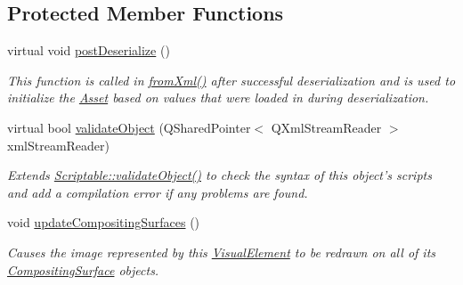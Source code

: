 \subsection*{Protected Member Functions}
\begin{DoxyCompactItemize}
\item 
virtual void \hyperlink{struct_picto_1_1_visual_element_a48c6087344d566cae7cd925443b571da}{post\-Deserialize} ()
\begin{DoxyCompactList}\small\item\em This function is called in \hyperlink{class_picto_1_1_asset_a8bed4da09ecb1c07ce0dab313a9aba67}{from\-Xml()} after successful deserialization and is used to initialize the \hyperlink{class_picto_1_1_asset}{Asset} based on values that were loaded in during deserialization. \end{DoxyCompactList}\item 
\hypertarget{struct_picto_1_1_visual_element_a681b115b3f3ea6d24ab803cab9d6ee5b}{virtual bool \hyperlink{struct_picto_1_1_visual_element_a681b115b3f3ea6d24ab803cab9d6ee5b}{validate\-Object} (Q\-Shared\-Pointer$<$ Q\-Xml\-Stream\-Reader $>$ xml\-Stream\-Reader)}\label{struct_picto_1_1_visual_element_a681b115b3f3ea6d24ab803cab9d6ee5b}

\begin{DoxyCompactList}\small\item\em Extends \hyperlink{class_picto_1_1_scriptable_ab6e2944c43a3b5d418bf7b251594386d}{Scriptable\-::validate\-Object()} to check the syntax of this object's scripts and add a compilation error if any problems are found. \end{DoxyCompactList}\item 
void \hyperlink{struct_picto_1_1_visual_element_a7aeaf89e302d12a27338ec1d2c1fa028}{update\-Compositing\-Surfaces} ()
\begin{DoxyCompactList}\small\item\em Causes the image represented by this \hyperlink{struct_picto_1_1_visual_element}{Visual\-Element} to be redrawn on all of its \hyperlink{struct_picto_1_1_compositing_surface}{Compositing\-Surface} objects. \end{DoxyCompactList}\end{DoxyCompactItemize}
